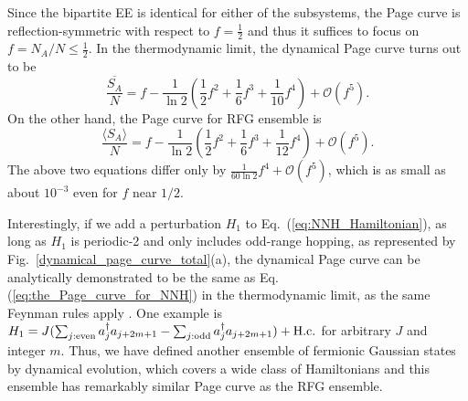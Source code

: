 \documentclass[twocolumn,english,prl,aps,superscriptaddress,amsmath,amssymb,floatfix]{revtex4-2}
\begin{document}
Since the bipartite EE is identical for either of the subsystems, the Page curve is reflection-symmetric with respect to $f=\frac{1}{2}$ and thus%
 it suffices to %
focus on $f=N_A/N\leq\frac{1}{2}$. In the thermodynamic limit, the dynamical Page curve turns out to be \cite{SM} 
\begin{equation}
\frac{\overline{S_{A}}}{N}=f-\frac{1}{\ln{2}}\left(\frac{1}{2}f^{2}+\frac{1}{6}f^{3}+\frac{1}{10}f^{4}\right)+\mathcal{O}(f^{5}).\label{eq:the_Page_curve_for_NNH}
\end{equation}
 On the other hand, the %
 Page curve for RFG ensemble
is \citep{Bianchi2021}
\begin{equation}
\frac{\langle S_{A}\rangle}{N}=f-\frac{1}{\ln{2}}\left(\frac{1}{2}f^{2}+\frac{1}{6}f^{3}+\frac{1}{12}f^{4}\right)+\mathcal{O}(f^{5}).\label{eq:the_Page_curve_result_for_CCRFG}
\end{equation}
The above two equations differ %
only by $\frac{1}{60\ln{2}}f^{4}+\mathcal{O}(f^5)$, %
which is as small as about $%
10^{-3}$ even for $f$ near $1/2$.


Interestingly, if we add a perturbation $H_{1}$ to Eq.~(\ref{eq:NNH_Hamiltonian}),
as long as $H_{1}$ is periodic-2 %
and %
only includes %
odd-range hopping, as represented by Fig.~\ref{dynamical_page_curve_total}(a),  %
the dynamical Page curve can be analytically demonstrated %
to be the same as Eq. (\ref{eq:the_Page_curve_for_NNH}) in the thermodynamic %
limit, as the same Feynman rules apply \cite{SM}. %
One example %
is $H_{1}=J(\sum_{j:\mathrm{even}}a_{j}^{\dagger}a_{j+2m+1}-\sum_{j:\mathrm{odd}}a_{j}^{\dagger}a_{j+2m+1})+{\rm H.c.}$
for arbitrary $J$ and integer $m$. Thus, we have defined another ensemble
of fermionic Gaussian states by dynamical evolution, which covers a
wide class of Hamiltonians and this ensemble has remarkably similar
Page curve as the RFG ensemble. 
\end{document}
